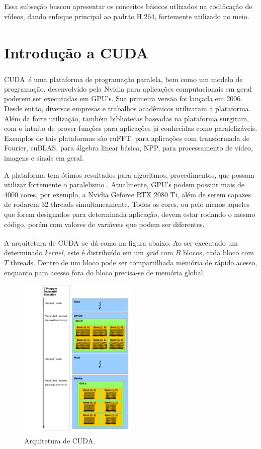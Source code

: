 \documentclass[cic,tc]{iiufrgs}
\newcommand{\reg}{\textsuperscript{\textregistered}}
\begin{document}
Essa subseção buscou apresentar os conceitos básicos utlizados na codificação de vídeos, 
dando enfoque principal ao padrão H.264, fortemente utilizado no meio.

\section{Introdução a CUDA\reg}
CUDA\reg~é uma plataforma de programação paralela, bem como um modelo de programação, 
desenvolvido pela Nvidia para aplicações computacionais em geral poderem ser executadas
em GPU's.
Sua primeira versão foi lançada em 2006.
Desde então, diversas empresas e trabalhos acadêmicos utilizaram a plataforma.
Além da forte utilização, também bibliotecas baseadas na plataforma surgiram, 
com o intuito de prover funções para aplicações já conhecidas como paralelizáveis.
Exemplos de tais plataformas são cuFFT, para aplicações com transformada de Fourier,
cuBLAS, para álgebra linear básica, NPP, para processamento de vídeo, imagens e 
sinais em geral.

A plataforma tem ótimos resultados para algoritmos, procedimentos, que possam utilizar
fortemente o paralelismo \cite{CUDAMAIN}.
Atualmente, GPU's podem possuir mais de 4000 cores, por exemplo, a Nvidia Geforce RTX 2080 Ti,
além de serem capazes de rodarem 32 threads simultaneamente.
Todos os cores, ou pelo menos aqueles que forem designados para determinada aplicação,
devem estar rodando o mesmo código, porém com valores de variáveis que podem ser diferentes.

A arquitetura de CUDA\reg~se dá como na figura abaixo.
Ao ser executado um determinado \textit{kernel}, este é distribuído em um \textit{grid}
com $B$ blocos, cada bloco com $T$ threads.
Dentro de um bloco pode ser compartilhada memória de rápido acesso, enquanto para 
acesso fora do bloco precisa-se de memória global.
\begin{figure}[H]
    \caption{Arquitetura de CUDA\reg.}
    \begin{center}
        \includegraphics[width=0.5\textwidth]{img/CUDAarch.png}
    \end{center}
\end{figure}
\end{document}
